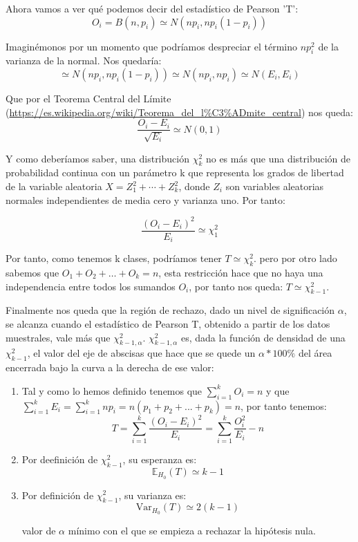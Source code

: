 \documentclass[nochap]{apuntes}
\begin{document}
Ahora vamos a ver qué podemos decir del estadístico de Pearson 'T':
\[
O_i=B(n,p_i) \simeq N(np_i, np_i(1-p_i))
\]

Imaginémonos por un momento que podríamos despreciar el término $np_i^2$ de la varianza de la normal. Nos quedaría:
\[
\simeq N(np_i, np_i(1-p_i)) \simeq N(np_i, np_i) \simeq N(E_i, E_i)
\]

Que por el Teorema Central del Límite (\url{https://es.wikipedia.org/wiki/Teorema_del_l%C3%ADmite_central}) nos queda:
\[
\frac{O_i-E_i}{\sqrt{E_i}} \simeq N(0,1)
\]

Y como deberíamos saber, una distribución $\chi^2_k$  no es más que una distribución de probabilidad continua con un parámetro k que representa los grados de libertad de la variable aleatoria $X = Z_1^2 + \cdots + Z_k^2$, donde $Z_i$ son variables aleatorias normales independientes de media cero y varianza uno. Por tanto:

\[
\frac{(O_i-E_i)^2}{E_i} \simeq \chi^2_1
\]

Por tanto, como tenemos k clases, podríamos tener $T\simeq \chi^2_k$. pero por otro lado sabemos que $O_1+O_2+…+O_k=n$, esta restricción hace que no haya una independencia entre todos los sumandos $O_i$, por tanto nos queda: $T\simeq \chi^2_{k-1}$.

Finalmente nos queda que la región de rechazo, dado un nivel de significación $\alpha$, se alcanza cuando el estadístico de Pearson T, obtenido a partir de los datos muestrales, vale más que $\chi^2_{k-1,α}$. $\chi^2_{k-1,α}$ es, dada la función de densidad de una $\chi^2_{k-1}$, el valor del eje de abscisas que hace que se quede un $\alpha*100\%$ del área encerrada bajo la curva a la derecha de ese valor:


\obs
\begin{enumerate}
\item  Tal y como lo hemos definido tenemos que $\sum_{i=1}^k O_i = n$ y que $\sum_{i=1}^k E_i = \sum_{i=1}^k np_i= n(p_1+p_2+...+p_k) = n$, por tanto tenemos:
\[
T=\sum_{i=1}^k \frac{(O_i-E_i)^2}{E_i} = \sum_{i=1}^k \frac{O_i^2}{E_i}-n
\]

\item Por deefinición de $\chi^2_{k-1}$, su esperanza es:
\[
\mathbb{E}_{H_0}(T) \simeq k-1
\]

\item Por definición de $\chi^2_{k-1}$, su varianza es:
\[
\mathrm{Var}_{H_0}(T) \simeq 2(k-1)
\]

\begin{defn}[p-valor]
valor de $\alpha$ mínimo con el que se empieza a rechazar la hipótesis nula.
\end{defn}

\end{enumerate}
\end{document}
